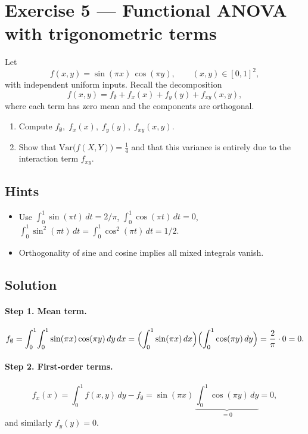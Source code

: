 \documentclass[a4paper]{article}
\begin{document}
\section*{Exercise 5 — Functional ANOVA with trigonometric terms}
\label{ex:FA_sincos_improved}

Let
\[
f(x,y)=\sin(\pi x)\,\cos(\pi y),
\qquad
(x,y)\in[0,1]^2,
\]
with independent uniform inputs.  Recall the decomposition
\[
f(x,y)=f_\emptyset + f_x(x) + f_y(y) + f_{xy}(x,y),
\]
where each term has zero mean and the components are orthogonal.

\begin{enumerate}%
  \item Compute
        \(
          f_\emptyset,\;
          f_x(x),\;
          f_y(y),\;
          f_{xy}(x,y).
        \)
  \item Show that
        \(\text{Var}\bigl(f(X,Y)\bigr)=\tfrac14\)
        and that this variance is entirely due to the interaction term
        \(f_{xy}\).
\end{enumerate}

\subsection*{Hints}
\begin{itemize}
  \item Use
        \(\int_0^1\sin(\pi t)\,dt=2/\pi\),
        \(\int_0^1\cos(\pi t)\,dt=0\),
        \(\int_0^1\sin^2(\pi t)\,dt=\int_0^1\cos^2(\pi t)\,dt=1/2\).
  \item Orthogonality of sine and cosine implies all mixed integrals vanish.
\end{itemize}

\subsection*{Solution}

\paragraph{Step 1. Mean term.}
\[
f_\emptyset
=\int_0^1\!\int_0^1\sin(\pi x)\cos(\pi y)\,dy\,dx
=\Bigl(\int_0^1\sin(\pi x)\,dx\Bigr)
 \Bigl(\int_0^1\cos(\pi y)\,dy\Bigr)
= \frac{2}{\pi}\cdot0 = 0.
\]

\paragraph{Step 2. First‐order terms.}
\[
f_x(x)
= \int_0^1 f(x,y)\,dy - f_\emptyset
= \sin(\pi x)\,\underbrace{\int_0^1\cos(\pi y)\,dy}_{=0}
= 0,
\]
and similarly $f_y(y)=0$.
\end{document}

